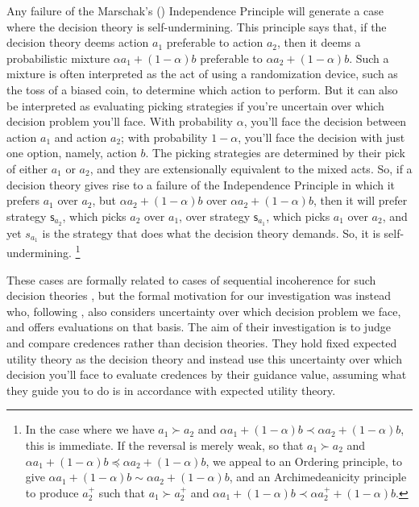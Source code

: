 \documentclass[a4paper]{article}
\newcommand\s{\mathsf{s}}
\newenvironment{CCM rewritten}
{\begingroup\color{blue}} %
{\endgroup}              %
\begin{document}
Any failure of the Marschak's (\citeyear{marschak1950rb}) Independence Principle will generate a case where the decision theory is self-undermining.
This principle says that, if the decision theory deems action $a_1$ preferable to action $a_2$, then it deems a probabilistic mixture $\alpha a_1+(1-\alpha)b$ preferable to $\alpha a_2+(1-\alpha)b$. 
Such a mixture is often interpreted as the act of using a randomization device, such as the toss of a biased coin, to determine which action to perform. 
But it can also be interpreted as evaluating picking strategies if you're uncertain over which decision problem you'll face. With probability $\alpha$, you'll face the decision between action $a_1$ and action $a_2$; with probability $1-\alpha$, you'll face the decision with just one option, namely, action $b$. The picking strategies are determined by their pick of either $a_1$ or $a_2$, and they are extensionally equivalent to the mixed acts. So, if a decision theory gives rise to a failure of the Independence Principle in which it prefers $a_1$ over $a_2$, but $\alpha a_2+(1-\alpha)b$ over $\alpha a_2+(1-\alpha)b$, then it will prefer strategy $\s_{a_2}$, which picks $a_2$ over $a_1$, over strategy $\s_{a_1}$, which picks $a_1$ over $a_2$, and yet $s_{a_1}$ is the strategy that does what the decision theory demands. So, it is self-undermining.%
\footnote{
	In the case where we have $a_1\succ a_2$ and $\alpha a_1 +(1-\alpha)b\prec \alpha a_2 + (1-\alpha)b$, this is immediate. 
	If the reversal is merely weak, so that $a_1\succ a_2$ and $\alpha a_1 +(1-\alpha)b\preceq \alpha a_2 + (1-\alpha)b$, we appeal to an Ordering principle, to give $\alpha a_1 +(1-\alpha)b\sim \alpha a_2 + (1-\alpha)b$, and an Archimedeanicity principle to produce $a^+_2$ such that $a_1\succ a^+_2$ and $\alpha a_1 +(1-\alpha)b\prec \alpha a^+_2 + (1-\alpha)b$. 
}

These cases are formally related to cases of sequential incoherence for such decision theories \citep{hammond1988cfeu,machina1989}, but the formal motivation for our investigation was instead \citet{levinstein2017pgeu} who, following \citet{schervish2009psr}, also considers uncertainty over which decision problem we face, and offers evaluations on that basis. 
The aim of their investigation is to judge and compare credences rather than decision theories.
They hold fixed expected utility theory as the decision theory and instead use this uncertainty over which decision you'll face to evaluate credences by their guidance value, assuming what they guide you to do is in accordance with expected utility theory. 
\end{document}
